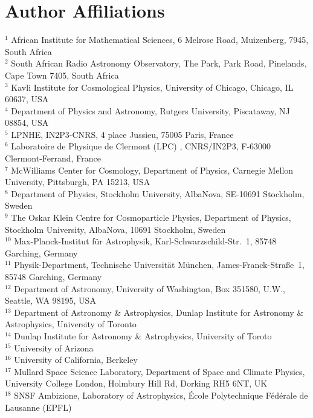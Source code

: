 \section*{Author Affiliations}
{\parbox{\textwidth}{
\footnotesize
$^{1}$ African Institute for Mathematical Sciences, 6 Melrose Road, Muizenberg, 7945, South Africa\\
$^{2}$ South African Radio Astronomy Observatory, The Park, Park Road, Pinelands, Cape Town 7405, South Africa\\
$^{3}$ Kavli Institute for Cosmological Physics, University of Chicago, Chicago, IL 60637, USA\\
$^{4}$ Department of Physics and Astronomy, Rutgers University, Piscataway, NJ 08854, USA\\
$^{5}$ LPNHE, IN2P3-CNRS, 4 place Jussieu, 75005 Paris, France\\
$^{6}$ Laboratoire de Physique de Clermont (LPC) , CNRS/IN2P3, F-63000 Clermont-Ferrand, France\\
$^{7}$ McWilliams Center for Cosmology, Department of Physics, Carnegie Mellon University, Pittsburgh, PA 15213, USA\\
$^{8}$ Department of Physics, Stockholm University, AlbaNova, SE-10691 Stockholm, Sweden\\
$^{9}$ The Oskar Klein Centre for Cosmoparticle Physics, Department of Physics, Stockholm University, AlbaNova, 10691 Stockholm, Sweden\\
$^{10}$ Max-Planck-Institut f\"{u}r Astrophysik, Karl-Schwarzschild-Str.~1, 85748 Garching, Germany\\
$^{11}$ Physik-Department, Technische Universit\"{a}t M\"{u}nchen, James-Franck-Stra\ss{}e~1, 85748 Garching, Germany\\
$^{12}$ Department of Astronomy, University of Washington, Box 351580, U.W., Seattle, WA 98195, USA\\
$^{13}$ Department of Astronomy \& Astrophysics, Dunlap Institute for Astronomy \& Astrophysics, University of Toronto\\
$^{14}$ Dunlap Institute for Astronomy \& Astrophysics, University of Toroto\\
$^{15}$ University of Arizona\\
$^{16}$ University of California, Berkeley \\
$^{17}$ Mullard Space Science Laboratory, Department of Space and Climate Physics, University College London, Holmbury Hill Rd, Dorking RH5 6NT, UK\\
$^{18}$ SNSF Ambizione, Laboratory of Astrophysics, \'{E}cole Polytechnique F\'{e}d\'{e}rale de Lausanne (EPFL)\\
}}
